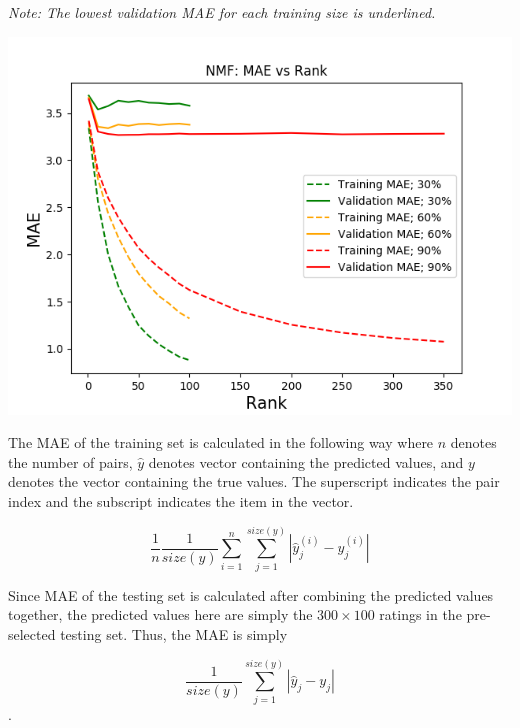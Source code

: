\documentclass[12pt]{article}
\newcommand{\skipline}{\vspace{\baselineskip}}
\begin{document}
\begin{center}
        \skipline

        \textit{Note: The lowest validation MAE for each training size is underlined.}
      \end{center}


      \begin{center}
        \includegraphics[scale=0.75]{nmf_mae.png}
      \end{center}

      \quad The MAE of the training set is calculated in the following way where $n$ denotes the number of pairs, $\hat{y}$ denotes vector containing the predicted values, and $y$ denotes the vector containing the true values. The superscript indicates the pair index and the subscript indicates the item in the vector.

      $$
      \frac{1}{n} \frac{1}{size(y)} \sum_{i=1}^{n} \sum_{j=1}^{size(y)} | \hat{y}_{j}^{(i)} - y_{j}^{(i)}|
      $$

      \quad Since MAE of the testing set is calculated after combining the predicted values together, the predicted values here are simply the $300 \times 100$ ratings in the pre-selected testing set. Thus, the MAE is simply

      $$\frac{1}{size(y)} \sum_{j=1}^{size(y)} | \hat{y}_{j} - y_{j}|$$.
\end{document}
